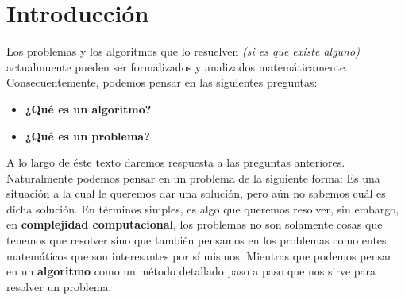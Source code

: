 \documentclass{article}
\begin{document}

\section{Introducción}
\noindent
Los problemas y los algoritmos que lo resuelven \textit{(si es que existe alguno)} actualmuente pueden 
ser formalizados y analizados matemáticamente. Consecuentemente, podemos pensar en las siguientes 
preguntas: 
\begin{itemize}
    \item \textbf{¿Qué es un algoritmo?}
    \item \textbf{¿Qué es un problema?}
\end{itemize}
A lo largo de éste texto daremos respuesta a las preguntas anteriores. Naturalmente podemos pensar en 
un problema de la siguiente forma:
\newline 
Es una situación a la cual le queremos dar una solución, pero aún no sabemos cuál es dicha solución.
\newline 
En términos simples, es algo que queremos resolver, sin embargo, en \textbf{complejidad computacional}, 
los problemas no son solamente cosas que tenemos que resolver sino que también pensamos en los problemas 
como entes matemáticos que son interesantes por sí mismos. Mientras que podemos pensar en un \textbf{algoritmo}
como un método detallado paso a paso que nos sirve para resolver un problema.
\end{document}
